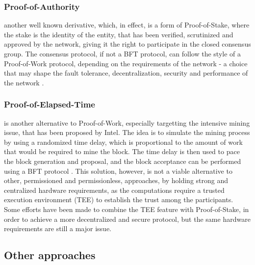 \documentclass[journal]{IEEEtran}
\begin{document}
\subsubsection{Proof-of-Authority} another well known derivative,
which, in effect, is a form of Proof-of-Stake, where the stake is the 
identity of the entity, that has been verified, scrutinized and
approved by the network, giving it the right to participate in the
closed consensus group. The consensus protocol, if not a BFT protocol, 
can follow the style of a Proof-of-Work protocol, depending on the 
requirements of the network - a choice that may shape the fault tolerance,
decentralization, security and performance of the network \cite{survey-dist-consensus}.

\subsubsection{Proof-of-Elapsed-Time} is another alternative to Proof-of-Work,
especially targetting the intensive mining issue, that has been proposed 
by Intel. The idea is to simulate the mining process by using a
randomized time delay, which is proportional to the amount of work
that would be required to mine the block. The time delay is then used to pace the
block generation and proposal, and the block acceptance can be performed
using a BFT protocol \cite{olson2018sawtooth}. This solution, however,
is not a viable alternative to other, permissioned and permissionless, approaches, 
by holding strong and centralized hardware requirements, 
as the computations require a trusted execution environment
(TEE) to establish the trust among the participants. Some efforts have been made
to combine the TEE feature with Proof-of-Stake, in order to achieve a
more decentralized and secure protocol, but the 
same hardware requirements are still a major issue.

\subsection{Other approaches}
\end{document}
